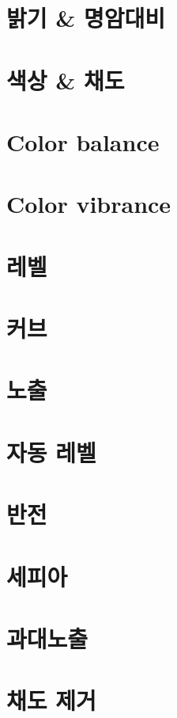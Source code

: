 \documentclass[12pt, a4paper, oneside]{book}
\let\stdsection\section
\renewcommand\section{\newpage\stdsection}
\begin{document}
																			
																			
																			
																			
																			
																			
																			
																			
																			



\section{	밝기 \& 명암대비				}							
\section{	색상 \& 채도				}							
\section{	Color balance				}							
\section{	Color vibrance				}							
\section{	레벨				}							
\section{	커브				}							
\section{	노출				}							
\section{	자동 레벨				}							
\section{	반전				}							
\section{	세피아				}							
\section{	과대노출				}							
\section{	채도 제거				}							
\end{document}

